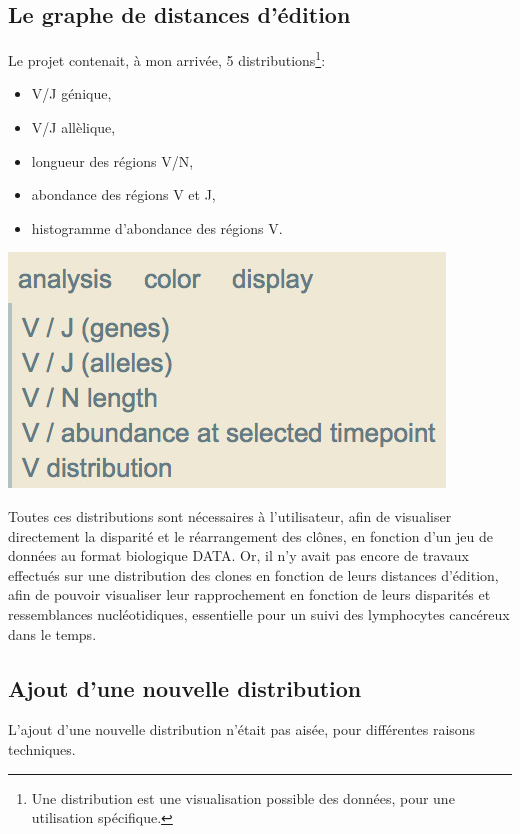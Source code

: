 \documentclass[pdftex,12pt,a4paper]{report}
\begin{document}
\begin{spacing}{1.2}
\chapter{Le graphe de distances d'édition}

Le projet contenait, à mon arrivée, 5 distributions\footnote{Une distribution est une visualisation possible des données, pour une utilisation spécifique.}:
\\[2mm]
\begin{minipage}{0.5\textwidth}
\begin{itemize}
\item V/J génique,
\item V/J allèlique,
\item longueur des régions V/N,
\item abondance des régions V et J,
\item histogramme d'abondance des régions V.
\end{itemize}
\end{minipage}
\begin{minipage}{0.5\textwidth}
	\includegraphics[width=\textwidth]{img/5distributions.jpg}
	\\
\end{minipage}


Toutes ces distributions sont nécessaires à l'utilisateur, afin de visualiser directement la disparité et le réarrangement des clônes, en fonction d'un jeu de données au format biologique DATA. Or, il n'y avait pas encore de travaux effectués sur une distribution des clones en fonction de leurs distances d'édition, afin de pouvoir visualiser leur rapprochement en fonction de leurs disparités et ressemblances nucléotidiques, essentielle pour un suivi des lymphocytes cancéreux dans le temps.

\section{Ajout d'une nouvelle distribution}
L'ajout d'une nouvelle distribution n'était pas aisée, pour différentes raisons techniques.


\end{spacing}
\end{document}
